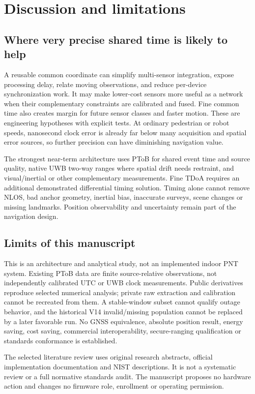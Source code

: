 \documentclass[11pt,letterpaper]{article}
\begin{document}
\section{Discussion and limitations}
\subsection{Where very precise shared time is likely to help}
A reusable common coordinate can simplify multi-sensor integration, expose processing delay, relate moving observations, and reduce per-device synchronization work. It may make lower-cost sensors more useful as a network when their complementary constraints are calibrated and fused. Fine common time also creates margin for future sensor classes and faster motion. These are engineering hypotheses with explicit tests. At ordinary pedestrian or robot speeds, nanosecond clock error is already far below many acquisition and spatial error sources, so further precision can have diminishing navigation value.

The strongest near-term architecture uses PToB for shared event time and source quality, native UWB two-way ranges where spatial drift needs restraint, and visual/inertial or other complementary measurements. Fine TDoA requires an additional demonstrated differential timing solution. Timing alone cannot remove NLOS, bad anchor geometry, inertial bias, inaccurate surveys, scene changes or missing landmarks. Position observability and uncertainty remain part of the navigation design.

\subsection{Limits of this manuscript}
This is an architecture and analytical study, not an implemented indoor PNT system. Existing PToB data are finite source-relative observations, not independently calibrated UTC or UWB clock measurements. Public derivatives reproduce selected numerical analysis; private raw extraction and calibration cannot be recreated from them. A stable-window subset cannot qualify outage behavior, and the historical V14 invalid/missing population cannot be replaced by a later favorable run. No GNSS equivalence, absolute position result, energy saving, cost saving, commercial interoperability, secure-ranging qualification or standards conformance is established.

The selected literature review uses original research abstracts, official implementation documentation and NIST descriptions. It is not a systematic review or a full normative standards audit. The manuscript proposes no hardware action and changes no firmware role, enrollment or operating permission.
\end{document}
